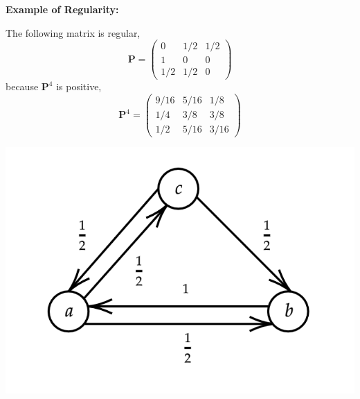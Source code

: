 \documentclass{tufte-handout}
\begin{document}
  \begin{marginfigure}
    \textbf{Example of Regularity:}

    \noindent The following matrix is regular,
    \[\boldsymbol{P}=\left(\begin{array}{ccc}0 & 1 / 2 & 1 / 2 \\ 1 & 0 & 0 \\ 1 / 2 & 1 / 2 & 0\end{array}\right)\]
    \noindent because $\boldsymbol{P}^4$ is positive,
    \[\boldsymbol{P}^{4}=\left(\begin{array}{ccc}9 / 16 & 5 / 16 & 1 / 8 \\ 1 / 4 & 3 / 8 & 3 / 8 \\ 1 / 2 & 5 / 16 & 3 / 16\end{array}\right)\]
    \begin{center}
    \includegraphics[width=\textwidth]{fig-12.png}
    \end{center}
  \end{marginfigure}
\end{document}

